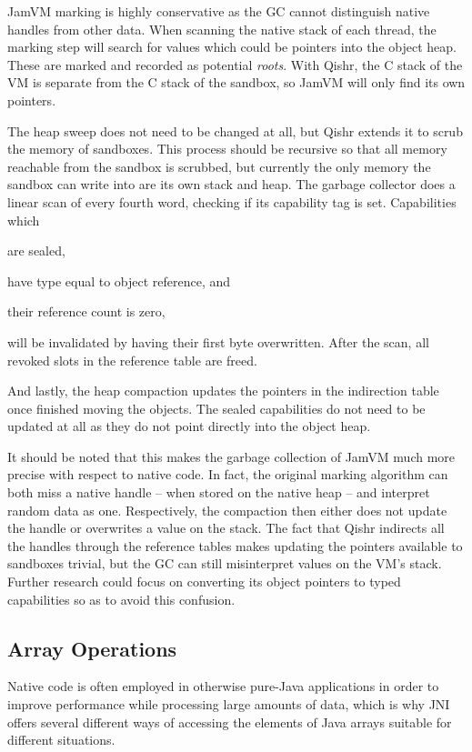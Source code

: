 \documentclass[a4paper,12pt,twoside,openright]{report}
\begin{document}
JamVM marking is highly conservative as the GC cannot distinguish native handles from other data. When scanning the native stack of each thread, the marking step will search for values which could be pointers into the object heap. These are marked and recorded as potential \emph{roots}. With Qishr, the C stack of the VM is separate from the C stack of the sandbox, so JamVM will only find its own pointers.

The heap sweep does not need to be changed at all, but Qishr extends it to scrub the memory of sandboxes. This process should be recursive so that all memory reachable from the sandbox is scrubbed, but currently the only memory the sandbox can write into are its own stack and heap. The garbage collector does a linear scan of every fourth word, checking if its capability tag is set. Capabilities which 
\begin{inparaenum}
\item are sealed,
\item have type equal to object reference, and
\item their reference count is zero,
\end{inparaenum}
will be invalidated by having their first byte overwritten. After the scan, all revoked slots in the reference table are freed.

And lastly, the heap compaction updates the pointers in the indirection table once finished moving the objects. The sealed capabilities do not need to be updated at all as they do not point directly into the object heap.

It should be noted that this makes the garbage collection of JamVM much more precise with respect to native code. In fact, the original marking algorithm can both miss a native handle -- when stored on the native heap -- and interpret random data as one. Respectively, the compaction then either does not update the handle or overwrites a value on the stack. The fact that Qishr indirects all the handles through the reference tables makes updating the pointers available to sandboxes trivial, but the GC can still misinterpret values on the VM's stack. Further research could focus on converting its object pointers to typed capabilities so as to avoid this confusion.

\subsection{Array Operations}

Native code is often employed in otherwise pure-Java applications in order to improve performance while processing large amounts of data, which is why JNI offers several different ways of accessing the elements of Java arrays suitable for different situations.
\end{document}

